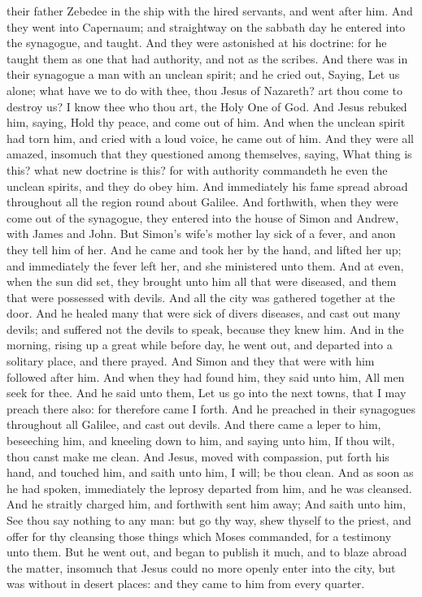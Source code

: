 their father Zebedee in the ship with the hired servants, and went after
him.  And they went into Capernaum; and straightway on
the sabbath day he entered into the synagogue, and taught.
 And they were astonished at his doctrine: for he taught
them as one that had authority, and not as the scribes. 
And there was in their synagogue a man with an unclean spirit; and he
cried out,  Saying, Let us alone; what have we to do with
thee, thou Jesus of Nazareth? art thou come to destroy us? I know thee
who thou art, the Holy One of God.  And Jesus rebuked
him, saying, Hold thy peace, and come out of him.  And
when the unclean spirit had torn him, and cried with a loud voice, he
came out of him.  And they were all amazed, insomuch that
they questioned among themselves, saying, What thing is this? what new
doctrine is this? for with authority commandeth he even the unclean
spirits, and they do obey him.  And immediately his fame
spread abroad throughout all the region round about Galilee.
 And forthwith, when they were come out of the synagogue,
they entered into the house of Simon and Andrew, with James and John.
 But Simon's wife's mother lay sick of a fever, and anon
they tell him of her.  And he came and took her by the
hand, and lifted her up; and immediately the fever left her, and she
ministered unto them.  And at even, when the sun did set,
they brought unto him all that were diseased, and them that were
possessed with devils.  And all the city was gathered
together at the door.  And he healed many that were sick
of divers diseases, and cast out many devils; and suffered not the
devils to speak, because they knew him.  And in the
morning, rising up a great while before day, he went out, and departed
into a solitary place, and there prayed.  And Simon and
they that were with him followed after him.  And when
they had found him, they said unto him, All men seek for thee.
 And he said unto them, Let us go into the next towns,
that I may preach there also: for therefore came I forth.
 And he preached in their synagogues throughout all
Galilee, and cast out devils.  And there came a leper to
him, beseeching him, and kneeling down to him, and saying unto him, If
thou wilt, thou canst make me clean.  And Jesus, moved
with compassion, put forth his hand, and touched him, and saith unto
him, I will; be thou clean.  And as soon as he had
spoken, immediately the leprosy departed from him, and he was cleansed.
 And he straitly charged him, and forthwith sent him
away;  And saith unto him, See thou say nothing to any
man: but go thy way, shew thyself to the priest, and offer for thy
cleansing those things which Moses commanded, for a testimony unto them.
 But he went out, and began to publish it much, and to
blaze abroad the matter, insomuch that Jesus could no more openly enter
into the city, but was without in desert places: and they came to him
from every quarter.

